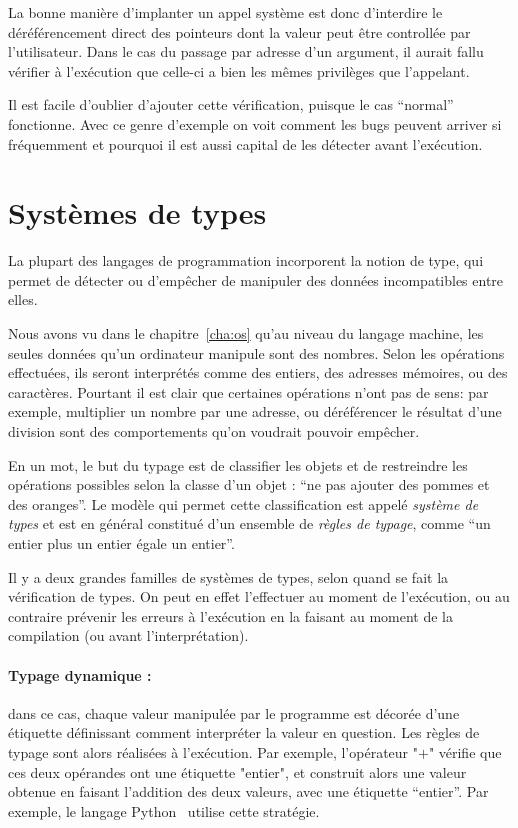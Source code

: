 La bonne manière d'implanter un appel système est donc d'interdire le
déréférencement direct des pointeurs dont la valeur peut être controllée par
l'utilisateur. Dans le cas du passage par adresse d'un argument, il aurait fallu
vérifier à l'exécution que celle-ci a bien les mêmes privilèges que l'appelant.

Il est facile d'oublier d'ajouter cette vérification, puisque le cas ``normal''
fonctionne. Avec ce genre d'exemple on voit comment les bugs peuvent arriver si
fréquemment et pourquoi il est aussi capital de les détecter avant l'exécution.


\section{Systèmes de types}

La plupart des langages de programmation incorporent la notion de type, qui
permet de détecter ou d'empêcher de manipuler des données incompatibles entre
elles.

Nous avons vu dans le chapitre~\ref{cha:os} qu'au niveau du langage machine, les
seules données qu'un ordinateur manipule sont des nombres. Selon les opérations
effectuées, ils seront interprétés comme des entiers, des adresses mémoires, ou
des caractères. Pourtant il est clair que certaines opérations n'ont pas de
sens: par exemple, multiplier un nombre par une adresse, ou déréférencer le
résultat d'une division sont des comportements qu'on voudrait pouvoir empêcher.

En un mot, le but du typage est de classifier les objets et de restreindre les
opérations possibles selon la classe d'un objet : ``ne pas ajouter des pommes et
des oranges''. Le modèle qui permet cette classification est appelé
\emph{système de types} et est en général constitué d'un ensemble de
\emph{règles de typage}, comme ``un entier plus un entier égale un entier''.

Il y a deux grandes familles de systèmes de types, selon quand se fait la
vérification de types. On peut en effet l'effectuer au moment de l'exécution, ou
au contraire prévenir les erreurs à l'exécution en la faisant au moment de la
compilation (ou avant l'interprétation).

\paragraph{Typage dynamique :} dans ce cas, chaque valeur manipulée par le
programme est décorée d'une étiquette définissant comment interpréter la valeur
en question. Les règles de typage sont alors réalisées à l'exécution. Par
exemple, l'opérateur "$+$" vérifie que ces deux opérandes ont une étiquette
"entier", et construit alors une valeur obtenue en faisant l'addition des deux
valeurs, avec une étiquette ``entier''. Par exemple, le langage
Python~ utilise cette stratégie.

